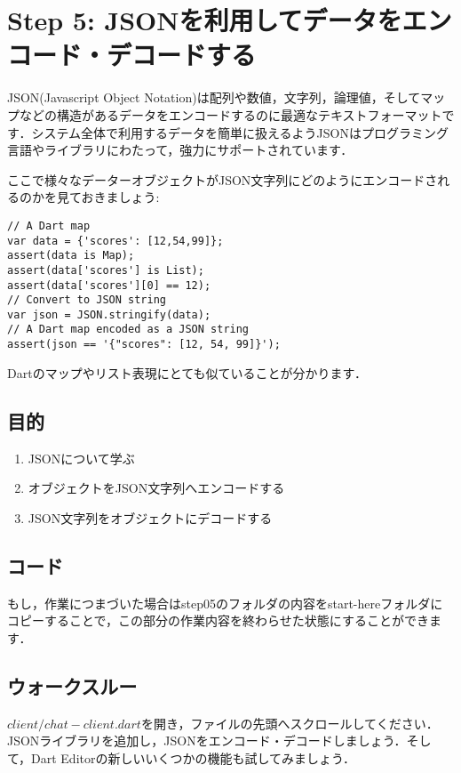 \section{Step 5: JSONを利用してデータをエンコード・デコードする}

JSON(Javascript Object Notation)は配列や数値，文字列，論理値，そしてマップなどの構造があるデータをエンコードするのに最適なテキストフォーマットです．システム全体で利用するデータを簡単に扱えるようJSONはプログラミング言語やライブラリにわたって，強力にサポートされています．

ここで様々なデーターオブジェクトがJSON文字列にどのようにエンコードされるのかを見ておきましょう:

\begin{verbatim}
// A Dart map
var data = {'scores': [12,54,99]};
assert(data is Map);
assert(data['scores'] is List);
assert(data['scores'][0] == 12);
// Convert to JSON string
var json = JSON.stringify(data);
// A Dart map encoded as a JSON string
assert(json == '{"scores": [12, 54, 99]}');
\end{verbatim}

Dartのマップやリスト表現にとても似ていることが分かります．

\subsection{目的}

\begin{enumerate}
\item JSONについて学ぶ
\item オブジェクトをJSON文字列へエンコードする
\item JSON文字列をオブジェクトにデコードする
\end{enumerate}

\subsection{コード}

もし，作業につまづいた場合はstep05のフォルダの内容をstart-hereフォルダにコピーすることで，この部分の作業内容を終わらせた状態にすることができます．

\subsection{ウォークスルー}

$ client/chat-client.dart $を開き，ファイルの先頭へスクロールしてください．JSONライブラリを追加し，JSONをエンコード・デコードしましょう．そして，Dart Editorの新しいいくつかの機能も試してみましょう．

